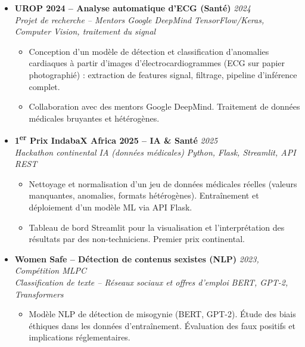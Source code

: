 \documentclass[a4paper,11pt]{article}
\begin{document}
\begin{itemize}[leftmargin=*, label={-}]
\item \textbf{UROP 2024 -- Analyse automatique d'ECG (Santé)} \hfill \textit{2024} \\
\textit{Projet de recherche -- Mentors Google DeepMind} \hfill \textit{TensorFlow/Keras, Computer Vision, traitement du signal}
\vspace{-2pt}
\begin{itemize}[leftmargin=0.4cm, nosep, label=\tiny$\bullet$]
    \item \small{Conception d'un modèle de détection et classification d'anomalies cardiaques à partir d'images d'électrocardiogrammes (ECG sur papier photographié) : extraction de features signal, filtrage, pipeline d'inférence complet.}
    \item \small{Collaboration avec des mentors Google DeepMind. Traitement de données médicales bruyantes et hétérogènes.}
\end{itemize}
\vspace{3pt}

\item \textbf{1\textsuperscript{er} Prix IndabaX Africa 2025 -- IA \& Santé} \hfill \textit{2025} \\
\textit{Hackathon continental IA (données médicales)} \hfill \textit{Python, Flask, Streamlit, API REST}
\vspace{-2pt}
\begin{itemize}[leftmargin=0.4cm, nosep, label=\tiny$\bullet$]
    \item \small{Nettoyage et normalisation d'un jeu de données médicales réelles (valeurs manquantes, anomalies, formats hétérogènes). Entraînement et déploiement d'un modèle ML via API Flask.}
    \item \small{Tableau de bord Streamlit pour la visualisation et l'interprétation des résultats par des non-techniciens. Premier prix continental.}
\end{itemize}
\vspace{3pt}

\item \textbf{Women Safe -- Détection de contenus sexistes (NLP)} \hfill \textit{2023, Compétition MLPC} \\
\textit{Classification de texte -- Réseaux sociaux et offres d'emploi} \hfill \textit{BERT, GPT-2, Transformers}
\vspace{-2pt}
\begin{itemize}[leftmargin=0.4cm, nosep, label=\tiny$\bullet$]
    \item \small{Modèle NLP de détection de misogynie (BERT, GPT-2). Étude des biais éthiques dans les données d'entraînement. Évaluation des faux positifs et implications réglementaires.}
\end{itemize}
\vspace{3pt}

\end{itemize}
\end{document}

